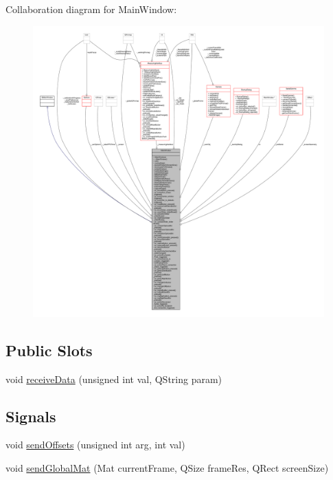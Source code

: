 Collaboration diagram for Main\+Window\+:
\nopagebreak
\begin{figure}[H]
\begin{center}
\leavevmode
\includegraphics[width=350pt]{classMainWindow__coll__graph}
\end{center}
\end{figure}
\subsection*{Public Slots}
\begin{DoxyCompactItemize}
\item 
void \mbox{\hyperlink{classMainWindow_ac7fa2374f28a46ed205758559114d79f}{receive\+Data}} (unsigned int val, Q\+String param)
\end{DoxyCompactItemize}
\subsection*{Signals}
\begin{DoxyCompactItemize}
\item 
void \mbox{\hyperlink{classMainWindow_ab46a8e562fc57b9581b90328e0872a67}{send\+Offsets}} (unsigned int arg, int val)
\item 
void \mbox{\hyperlink{classMainWindow_a302481f26ce2f1666e4a4dfaddacb08e}{send\+Global\+Mat}} (Mat current\+Frame, Q\+Size frame\+Res, Q\+Rect screen\+Size)
\end{DoxyCompactItemize}
